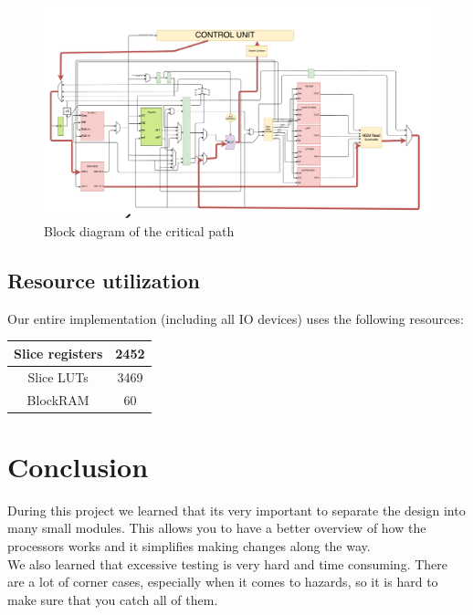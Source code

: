 \documentclass[12pt]{article}
\begin{document}
\begin{figure}[!hbtp]
\centering
\includegraphics[scale = 0.32, angle = 90]{DiagramCriticalPath.pdf}    
\caption{Block diagram of the critical path}
\label{fig:crit-path}
\end{figure}

\subsection{Resource utilization}
Our entire implementation (including all IO devices) uses the following resources:
\begin{table}[!h]
\centering
\begin{tabular}{|c|c|}
\hline
Slice registers & 2452 \\
\hline 
Slice LUTs & 3469 \\ 
\hline
BlockRAM & 60 \\
\hline
\end{tabular}
\end{table}

\section{Conclusion}
During this project we learned that its very important to separate the design into many small modules. This allows you to have a better overview of how the processors works and it simplifies making changes along the way. \\
We also learned that excessive testing is very hard and time consuming. There are a lot of corner cases, especially when it comes to hazards, so it is hard to make sure that you catch all of them.
\end{document}
